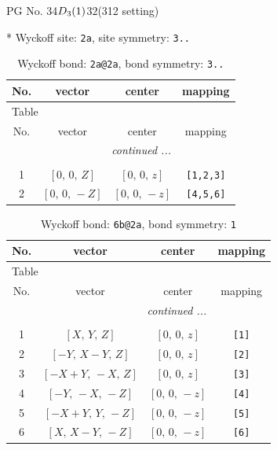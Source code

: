 \documentclass[fleqn,8pt]{jsarticle}
\begin{document}
\setcounter{MaxMatrixCols}{32}

\renewcommand{\tablename}{Table~}
\renewcommand{\figurename}{Figure~}
\begin{center}
\LARGE
PG No. 34\quad$D_{\rm 3}(1)$\quad$32$\quad(312 setting)\quad[ trigonal ]
\end{center}


* Wyckoff site: {\tt 2a}, site symmetry: {\tt 3..}
\renewcommand{\arraystretch}{1.2}
\begin{longtable}{cccc}
\caption{Wyckoff bond: {\tt 2a@2a}, bond symmetry: {\tt 3..}}
 \\
 \hline \hline
No. & vector & center & mapping \\ \hline \endfirsthead

\multicolumn{3}{l}{\tablename\ \thetable{}} \\
 \hline \hline
No. & vector & center & mapping \\ \hline \endhead

 \hline \hline
\multicolumn{3}{r}{\footnotesize\it continued ...} \\ \endfoot

 \hline \hline
\multicolumn{3}{r}{} \\ \endlastfoot

1 & $\left[ 0,\, 0,\, Z \right]$ & $\left[ 0,\, 0,\, z \right]$ & {\tt [1,2,3]} \\ \hline
2 & $\left[ 0,\, 0,\, - Z \right]$ & $\left[ 0,\, 0,\, - z \right]$ & {\tt [4,5,6]} \\
\end{longtable}
\renewcommand{\arraystretch}{1.2}
\begin{longtable}{cccc}
\caption{Wyckoff bond: {\tt 6b@2a}, bond symmetry: {\tt 1}}
 \\
 \hline \hline
No. & vector & center & mapping \\ \hline \endfirsthead

\multicolumn{3}{l}{\tablename\ \thetable{}} \\
 \hline \hline
No. & vector & center & mapping \\ \hline \endhead

 \hline \hline
\multicolumn{3}{r}{\footnotesize\it continued ...} \\ \endfoot

 \hline \hline
\multicolumn{3}{r}{} \\ \endlastfoot

1 & $\left[ X,\, Y,\, Z \right]$ & $\left[ 0,\, 0,\, z \right]$ & {\tt [1]} \\ \hline
2 & $\left[ - Y,\, X - Y,\, Z \right]$ & $\left[ 0,\, 0,\, z \right]$ & {\tt [2]} \\ \hline
3 & $\left[ - X + Y,\, - X,\, Z \right]$ & $\left[ 0,\, 0,\, z \right]$ & {\tt [3]} \\ \hline
4 & $\left[ - Y,\, - X,\, - Z \right]$ & $\left[ 0,\, 0,\, - z \right]$ & {\tt [4]} \\ \hline
5 & $\left[ - X + Y,\, Y,\, - Z \right]$ & $\left[ 0,\, 0,\, - z \right]$ & {\tt [5]} \\ \hline
6 & $\left[ X,\, X - Y,\, - Z \right]$ & $\left[ 0,\, 0,\, - z \right]$ & {\tt [6]} \\
\end{longtable}
\end{document}
